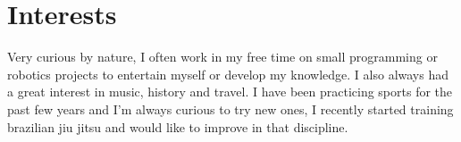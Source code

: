 \documentclass[letterpaper]{twentysecondcv - EN} %
\begin{document}
%
%
%	
%	
%	
%	
%	
%	



\section{Interests}

Very curious by nature, I often work in my free time on small programming or robotics projects to entertain myself or develop my knowledge. I also always had a great interest in music, history and travel. I have been practicing sports for the past few years and I'm always curious to try new ones, I recently started training brazilian jiu jitsu and would like to improve in that discipline.
\end{document}
